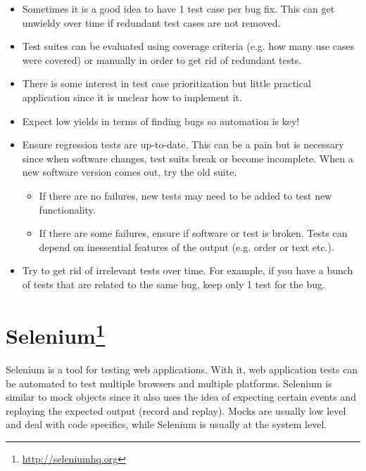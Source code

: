 \documentclass[11pt]{article}
\begin{document}
\begin{itemize}

\item Sometimes it is a good idea to have 1 test case per bug fix. This can get unwieldy over time if redundant test cases are not removed.

\item Test suites can be evaluated using coverage criteria (e.g. how many use cases were covered) or manually in order to get rid of redundant tests.

\item There is some interest in test case prioritization but little practical application since it is unclear how to implement it.

\item Expect low yields in terms of finding bugs so automation is key!

\item Ensure regression tests are up-to-date. This can be a pain but is necessary since when software changes, test suits break or become incomplete. When a new software version comes out, try the old suite. 

\begin{itemize}
\item If there are no failures, new tests may need to be added to test new functionality.

\item If there are some failures, ensure if software or test is broken. Tests can depend on inessential features of the output (e.g. order or text etc.).
\end{itemize}

\item Try to get rid of irrelevant tests over time. For example, if you have a bunch of tests that are related to the same bug, keep only 1 test for the bug. 
\end{itemize}

\section*{Selenium\footnote{\url{http://seleniumhq.org}}}

Selenium is a tool for testing web applications. With it, web application tests can be automated to test multiple browsers and multiple platforms. Selenium is similar to mock objects since it also uses the idea of expecting certain events and replaying the expected output (record and replay). Mocks are usually low level and deal with code specifics, while Selenium is usually at the system level.
\end{document}
